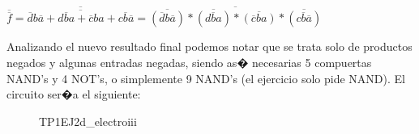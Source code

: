 $\overline{\overline{f}}=\overline{\overline{\overline{d}b\overline{a}+d\overline{b}a+\overline{c}ba+c\overline{b}\overline{a}}}=\overline{\overline{(\overline{d}b\overline{a})} * \overline{(d\overline{b}a)} * \overline{(\overline{c}ba)} * \overline{(c\overline{b}\overline{a})}}$

Analizando el nuevo resultado final podemos notar que se trata solo
de productos negados y algunas entradas negadas, siendo as� necesarias
5 compuertas NAND's y 4 NOT's, o simplemente 9 NAND's (el ejercicio
solo pide NAND). El circuito ser�a el siguiente:

\begin{figure}
%

%
\caption{TP1EJ2d\_electroiii}

%
%
\end{figure}
